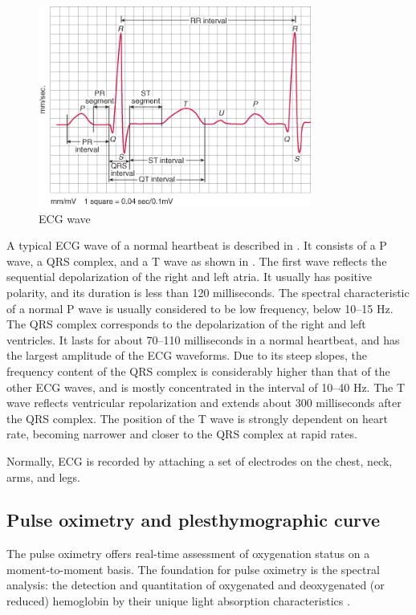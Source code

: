 \begin{figure}[!ht]
\centering
\includegraphics[width=0.8\textwidth]{images/ECGwave.png}
\caption{ECG wave}
\label{fig:ecg}
\end{figure}


A typical ECG wave of a normal heartbeat is described
in \cite{wang2008analysis}. It consists of a P wave, a QRS complex,
and a T wave as shown in . The first wave reflects the
sequential depolarization of the right and left atria. It usually has
positive polarity, and its duration is less than 120 milliseconds. The
spectral characteristic of a normal P wave is usually considered to be
low frequency, below 10–15 Hz. The QRS complex corresponds to the
depolarization of the right and left ventricles. It lasts for about
70–110 milliseconds in a normal heartbeat, and has the largest
amplitude of the ECG waveforms. Due to its steep slopes, the frequency
content of the QRS complex is considerably higher than that of the
other ECG waves, and is mostly concentrated in the interval of 10–40
Hz. The T wave reflects ventricular repolarization and extends about
300 milliseconds after the QRS complex. The position of the T wave is
strongly dependent on heart rate, becoming narrower and closer to the
QRS complex at rapid rates.


Normally, ECG is recorded by attaching a set of electrodes on the
chest, neck, arms, and legs.


\subsection{Pulse oximetry and plesthymographic curve}
\label{subsec:setup:phys-signals:ppg}


The pulse oximetry offers real-time assessment of oxygenation status
on a moment-to-moment basis. The foundation for pulse oximetry is the
spectral analysis: the detection and quantitation of oxygenated and
deoxygenated (or reduced) hemoglobin by their unique light absorption
characteristics \cite{sinex1999pulse, bagha2011real}.

